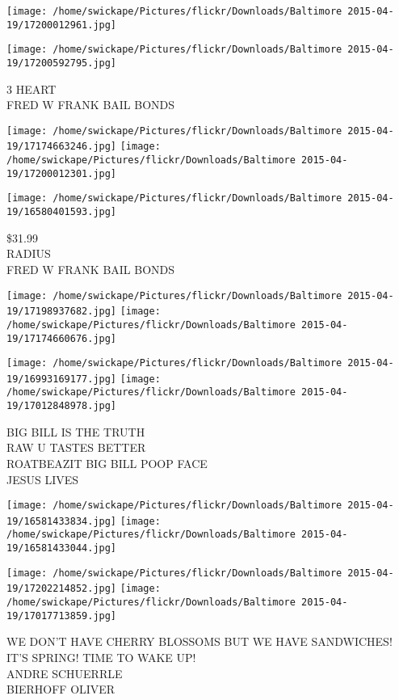 \documentclass[10pt,letterpaper]{article}
\begin{document}
\texttt{[image: /home/swickape/Pictures/flickr/Downloads/Baltimore 2015-04-19/17200012961.jpg]}

\vspace{0.25in}
\texttt{[image: /home/swickape/Pictures/flickr/Downloads/Baltimore 2015-04-19/17200592795.jpg]}

3 HEART\\
FRED W FRANK BAIL BONDS\\
\pagebreak

\texttt{[image: /home/swickape/Pictures/flickr/Downloads/Baltimore 2015-04-19/17174663246.jpg]}
\texttt{[image: /home/swickape/Pictures/flickr/Downloads/Baltimore 2015-04-19/17200012301.jpg]}

\vspace{0.25in}
\texttt{[image: /home/swickape/Pictures/flickr/Downloads/Baltimore 2015-04-19/16580401593.jpg]}

\$31.99\\
RADIUS\\
FRED W FRANK BAIL BONDS\\
\pagebreak

\texttt{[image: /home/swickape/Pictures/flickr/Downloads/Baltimore 2015-04-19/17198937682.jpg]}
\texttt{[image: /home/swickape/Pictures/flickr/Downloads/Baltimore 2015-04-19/17174660676.jpg]}

\texttt{[image: /home/swickape/Pictures/flickr/Downloads/Baltimore 2015-04-19/16993169177.jpg]}
\texttt{[image: /home/swickape/Pictures/flickr/Downloads/Baltimore 2015-04-19/17012848978.jpg]}

BIG BILL IS THE TRUTH\\
RAW U TASTES BETTER\\
ROATBEAZIT BIG BILL POOP FACE\\
JESUS LIVES\\
\pagebreak

\texttt{[image: /home/swickape/Pictures/flickr/Downloads/Baltimore 2015-04-19/16581433834.jpg]}
\texttt{[image: /home/swickape/Pictures/flickr/Downloads/Baltimore 2015-04-19/16581433044.jpg]}

\texttt{[image: /home/swickape/Pictures/flickr/Downloads/Baltimore 2015-04-19/17202214852.jpg]}
\texttt{[image: /home/swickape/Pictures/flickr/Downloads/Baltimore 2015-04-19/17017713859.jpg]}

WE DON'T HAVE CHERRY BLOSSOMS BUT WE HAVE SANDWICHES!\\
IT'S SPRING! TIME TO WAKE UP!\\
ANDRE SCHUERRLE\\
BIERHOFF OLIVER\\
\pagebreak
\end{document}
